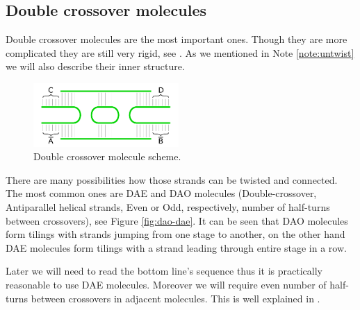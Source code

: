 	\subsection{Double crossover molecules}
	\label{sec:double_crossover}
		
		Double crossover molecules are the most important ones. Though they are more complicated they are still very rigid, see \cite{seeman93}. As we mentioned in Note \ref{note:untwist} we will also describe their inner structure. %
		
		\begin{figure}[H]
		\begin{center}
			\includegraphics[width=0.492\textwidth]{./figures/strand_types/double_crossover.pdf}
			\caption{Double crossover molecule scheme.}
			\label{fig:double_crossover}
		\end{center}
		\end{figure}
		
		There are many possibilities how those strands can be twisted and connected. The most common ones are DAE and DAO molecules (Double-crossover, Antiparallel helical strands, Even or Odd, respectively, number of half-turns between crossovers), see Figure \ref{fig:dao-dae}. It can be seen that DAO molecules form tilings with strands jumping from one stage to another, on the other hand DAE molecules form tilings with a strand leading through entire stage in a row.
		
		Later we will need to read the bottom line's sequence thus it is practically reasonable to use DAE molecules. Moreover we will require even number of half-turns between crossovers in adjacent molecules. This is well explained in \cite[p.37]{winfree_phd}.
		

